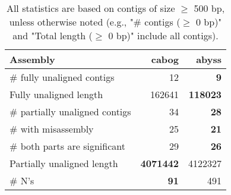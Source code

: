 \documentclass[12pt,a4paper]{article}
\begin{document}
\begin{table}[ht]
\begin{center}
\caption{All statistics are based on contigs of size $\geq$ 500 bp, unless otherwise noted (e.g., "\# contigs ($\geq$ 0 bp)" and "Total length ($\geq$ 0 bp)" include all contigs).}
\begin{tabular}{|l*{2}{|r}|}
\hline
Assembly & cabog & abyss \\ \hline
\# fully unaligned contigs & 12 & {\bf 9} \\ \hline
Fully unaligned length & 162641 & {\bf 118023} \\ \hline
\# partially unaligned contigs & 34 & {\bf 28} \\ \hline
\hspace{5mm}\# with misassembly & 25 & {\bf 21} \\ \hline
\hspace{5mm}\# both parts are significant & 29 & {\bf 26} \\ \hline
Partially unaligned length & {\bf 4071442} & 4122327 \\ \hline
\# N's & {\bf 91} & 491 \\ \hline
\end{tabular}
\end{center}
\end{table}
\end{document}
